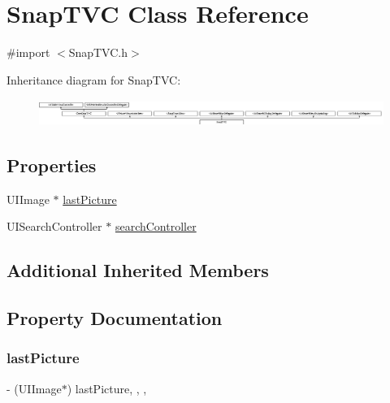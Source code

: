 \hypertarget{interface_snap_t_v_c}{}\section{Snap\+T\+VC Class Reference}
\label{interface_snap_t_v_c}


{\ttfamily \#import $<$Snap\+T\+V\+C.\+h$>$}

Inheritance diagram for Snap\+T\+VC\+:\begin{figure}[H]
\begin{center}
\leavevmode
\includegraphics[height=0.864198cm]{interface_snap_t_v_c}
\end{center}
\end{figure}
\subsection*{Properties}
\begin{DoxyCompactItemize}
\item 
U\+I\+Image $\ast$ \hyperlink{interface_snap_t_v_c_a89bd5a932d20124b0435732cb39da8c4}{last\+Picture}
\item 
U\+I\+Search\+Controller $\ast$ \hyperlink{interface_snap_t_v_c_a3795ab183a886ed570b7dc849e93f1b0}{search\+Controller}
\end{DoxyCompactItemize}
\subsection*{Additional Inherited Members}


\subsection{Property Documentation}
\hypertarget{interface_snap_t_v_c_a89bd5a932d20124b0435732cb39da8c4}{}\label{interface_snap_t_v_c_a89bd5a932d20124b0435732cb39da8c4} 
\subsubsection{\texorpdfstring{last\+Picture}{lastPicture}}
{\footnotesize\ttfamily -\/ (U\+I\+Image$\ast$) last\+Picture\hspace{0.3cm}{\ttfamily [read]}, {\ttfamily [write]}, {\ttfamily [nonatomic]}, {\ttfamily [weak]}}


